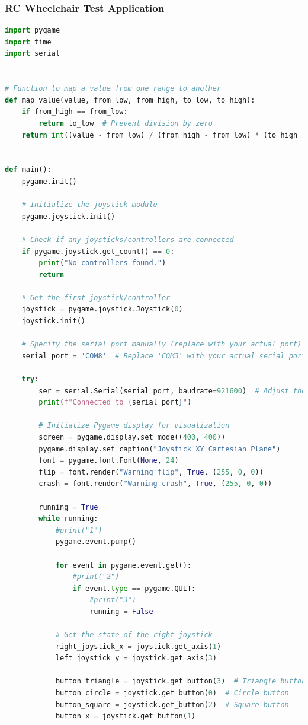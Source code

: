 \documentclass[conference]{IEEEtran}
\begin{document}
    \subsubsection{RC Wheelchair Test Application}
    \begin{lstlisting}[language=Python, caption=RC Wheelchair Test Application, label=wheelchair_test_code]
import pygame
import time
import serial


# Function to map a value from one range to another
def map_value(value, from_low, from_high, to_low, to_high):
    if from_high == from_low:
        return to_low  # Prevent division by zero
    return int((value - from_low) / (from_high - from_low) * (to_high - to_low) + to_low)


def main():
    pygame.init()

    # Initialize the joystick module
    pygame.joystick.init()

    # Check if any joysticks/controllers are connected
    if pygame.joystick.get_count() == 0:
        print("No controllers found.")
        return

    # Get the first joystick/controller
    joystick = pygame.joystick.Joystick(0)
    joystick.init()

    # Specify the serial port manually (replace with your actual port)
    serial_port = 'COM8'  # Replace 'COM3' with your actual serial port name

    try:
        ser = serial.Serial(serial_port, baudrate=921600)  # Adjust the baudrate if needed
        print(f"Connected to {serial_port}")

        # Initialize Pygame display for visualization
        screen = pygame.display.set_mode((400, 400))
        pygame.display.set_caption("Joystick XY Cartesian Plane")
        font = pygame.font.Font(None, 24)
        flip = font.render("Warning flip", True, (255, 0, 0))
        crash = font.render("Warning crash", True, (255, 0, 0))

        running = True
        while running:
            #print("1")
            pygame.event.pump()

            for event in pygame.event.get():
                #print("2")
                if event.type == pygame.QUIT:
                    #print("3")
                    running = False

            # Get the state of the right joystick
            right_joystick_x = joystick.get_axis(1)
            left_joystick_y = joystick.get_axis(3)

            button_triangle = joystick.get_button(3)  # Triangle button
            button_circle = joystick.get_button(0)  # Circle button
            button_square = joystick.get_button(2)  # Square button
            button_x = joystick.get_button(1)




\end{lstlisting}
\end{document}
